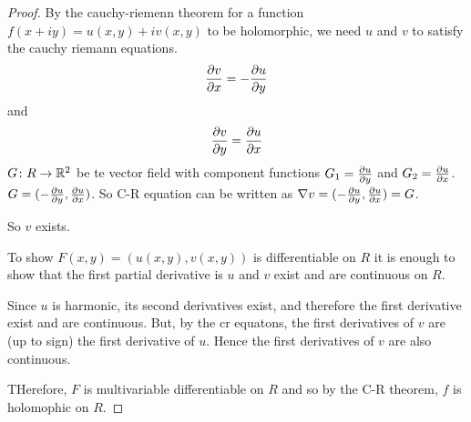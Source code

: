 \begin{proof} By the cauchy-riemenn theorem for a function \(f(x+iy)=u(x,y)+iv(x,y)\) to be holomorphic, we need \(u\) and \(v\) to satisfy the cauchy riemann equations. \[\frac{\partial v}{\partial x}=-\frac{\partial u}{\partial y} \] and \[\frac{\partial v}{\partial y}=\frac{\partial u}{\partial x}\]
\(G\colon R\to \mathbb{R}^2\) be te vector field with component functions \(G_1=\frac{\partial u}{\partial y}\) and \(G_2=\frac{\partial u}{\partial x}\). \(G=(-\frac{\partial u}{\partial y}, \frac{\partial u}{\partial x})\).
So C-R equation can be written as \(\nabla v= (-\frac{\partial u}{\partial y}, \frac{\partial u}{\partial x}) = G\). 


So \(v\) exists. 

To show \(F(x,y)=(u(x,y),v(x,y))\) is differentiable on \(R\) it is enough to show that the first partial derivative is \(u\) and \(v\) exist and are continuous on \(R\). 

Since \(u\) is harmonic, its second derivatives exist, and therefore the first derivative exist and are continuous. But, by the cr equatons, the first derivatives of \(v\) are (up to sign) the first derivative of \(u\). Hence the first derivatives of \(v\) are also continuous. 

THerefore, \(F\) is multivariable differentiable on \(R\) and so by the C-R theorem, \(f\) is holomophic on \(R\).
\end{proof}